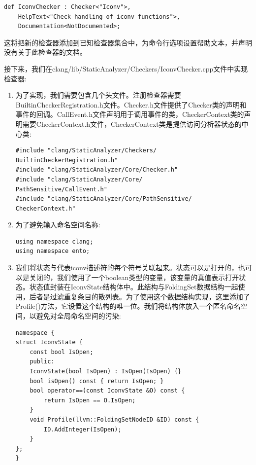 \begin{lstlisting}[caption={}]
def IconvChecker : Checker<"Iconv">,
	HelpText<"Check handling of iconv functions">,
	Documentation<NotDocumented>;
\end{lstlisting}

这将把新的检查器添加到已知检查器集合中，为命令行选项设置帮助文本，并声明没有关于此检查器的文档。\par

接下来，我们在clang/lib/StaticAnalyzer/Checkers/IconvChecker.cpp文件中实现检查器:\par

\begin{enumerate}
\item 为了实现，我们需要包含几个头文件。注册检查器需要BuiltinCheckerRegistration.h文件。Checker.h文件提供了Checker类的声明和事件的回调。CallEvent.h文件声明用于调用事件的类，CheckerContext类的声明需要CheckerContext.h文件，CheckerContext类是提供访问分析器状态的中心类:
\begin{lstlisting}[caption={}]
#include "clang/StaticAnalyzer/Checkers/
BuiltinCheckerRegistration.h"
#include "clang/StaticAnalyzer/Core/Checker.h"
#include "clang/StaticAnalyzer/Core/
PathSensitive/CallEvent.h"
#include "clang/StaticAnalyzer/Core/PathSensitive/
CheckerContext.h"
\end{lstlisting}


\item 为了避免输入命名空间名称:
\begin{lstlisting}[caption={}]
using namespace clang;
using namespace ento;
\end{lstlisting}

\item 我们将状态与代表iconv描述符的每个符号关联起来。状态可以是打开的，也可以是关闭的，我们使用了一个boolean类型的变量，该变量的真值表示打开状态。状态值封装在IconvState结构体中。此结构与FoldingSet数据结构一起使用，后者是过滤重复条目的散列表。为了使用这个数据结构实现，这里添加了Profile()方法，它设置这个结构的唯一位。我们将结构体放入一个匿名命名空间，以避免对全局命名空间的污染:
\begin{lstlisting}[caption={}]
namespace {
struct IconvState {
	const bool IsOpen;
	public:
	IconvState(bool IsOpen) : IsOpen(IsOpen) {}
	bool isOpen() const { return IsOpen; }
	bool operator==(const IconvState &O) const {
		return IsOpen == O.IsOpen;
	}
	void Profile(llvm::FoldingSetNodeID &ID) const {
		ID.AddInteger(IsOpen);
	}
};
}
\end{lstlisting}


\end{enumerate}

